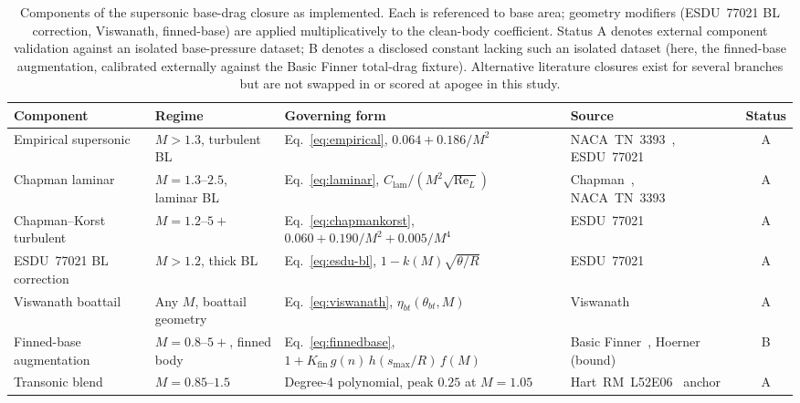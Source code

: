 \begin{table}[t]
\centering
\caption{Components of the supersonic base-drag closure as implemented. Each is
referenced to base area; geometry modifiers (ESDU~77021 BL correction, Viswanath,
finned-base) are applied multiplicatively to the clean-body coefficient. Status A
denotes external component validation against an isolated base-pressure dataset; B
denotes a disclosed constant lacking such an isolated dataset (here, the
finned-base augmentation, calibrated externally against the Basic Finner
total-drag fixture). Alternative literature closures exist for several branches
but are not swapped in or scored at apogee in this study.}
\label{tab:closures}
\small
\setlength{\tabcolsep}{4pt}
\begin{tabularx}{\textwidth}{l l X X c}
\toprule
Component & Regime & Governing form & Source & Status \\
\midrule
Empirical supersonic & $M > 1.3$, turbulent BL & Eq.~\eqref{eq:empirical},
   $0.064 + 0.186/M^{2}$ & NACA~TN~3393~\cite{chapman1955}, ESDU~77021~\cite{esdu77021} & A \\
Chapman laminar & $M = 1.3$--$2.5$, laminar BL & Eq.~\eqref{eq:laminar},
   $C_{\text{lam}}/(M^{2}\sqrt{\mathrm{Re}_{L}})$ & Chapman~\cite{chapman1950}, NACA~TN~3393~\cite{chapman1955} & A \\
Chapman--Korst turbulent & $M = 1.2$--$5{+}$ & Eq.~\eqref{eq:chapmankorst},
   $0.060 + 0.190/M^{2} + 0.005/M^{4}$ & ESDU~77021~\cite{esdu77021} & A \\
ESDU~77021 BL correction & $M > 1.2$, thick BL & Eq.~\eqref{eq:esdu-bl},
   $1 - k(M)\sqrt{\theta/R}$ & ESDU~77021~\cite{esdu77021} & A \\
Viswanath boattail & Any $M$, boattail geometry & Eq.~\eqref{eq:viswanath},
   $\eta_{bt}(\theta_{bt}, M)$ & Viswanath~\cite{viswanath1996} & A \\
Finned-base augmentation & $M = 0.8$--$5{+}$, finned body & Eq.~\eqref{eq:finnedbase},
   $1 + K_{\text{fin}}\,g(n)\,h(s_{\max}/R)\,f(M)$ & Basic Finner~\cite{dupuis1997}, Hoerner~\cite{hoerner1965} (bound) & B \\
Transonic blend & $M = 0.85$--$1.5$ & Degree-4 polynomial, peak $0.25$ at $M{=}1.05$
   & Hart~RM~L52E06~\cite{hart1952basedrag} anchor & A \\
\bottomrule
\end{tabularx}
\end{table}
